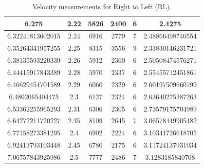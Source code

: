 \documentclass[a4paper]{report}
\numberwithin{equation}{section}
\begin{document}
\begin{table}[!ht]
\begin{tabular}{|c|c|c|c|c|c|}
        6.275 & 2.22 & 5826 & 2400 & 6 & 2.4275 \\ \hline
        6.32241813602015 & 2.24 & 6916 & 2779 & 7 & 2.48866498740554 \\ \hline
        6.35264341957255 & 2.25 & 8315 & 3556 & 9 & 2.33830146231721 \\ \hline
        6.38135593220339 & 2.26 & 5912 & 2360 & 6 & 2.50508474576271 \\ \hline
        6.44415917843389 & 2.28 & 5970 & 2337 & 6 & 2.55455712451861 \\ \hline
        6.46629454701589 & 2.29 & 6060 & 2329 & 6 & 2.60197509660799 \\ \hline
        6.4802065404475 & 2.3 & 6127 & 2324 & 6 & 2.63640275387263 \\ \hline
        6.53362255965293 & 2.31 & 6306 & 2305 & 6 & 2.73579175704989 \\ \hline
        6.64272211720227 & 2.35 & 8109 & 2645 & 7 & 3.06578449905482 \\ \hline
        6.77158273381295 & 2.4 & 6902 & 2224 & 6 & 3.10341726618705 \\ \hline
        6.92413793103448 & 2.45 & 6780 & 2175 & 6 & 3.11724137931034 \\ \hline
        7.06757843925986 & 2.5 & 7777 & 2486 & 7 & 3.1283185840708 \\ \hline
    \end{tabular}
    \caption{Velocity measurements for Right to Left (RL).}
\end{table}
\end{document}

